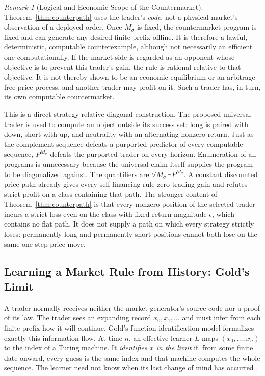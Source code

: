 \documentclass[aps,pra,reprint,superscriptaddress,amsmath,amssymb,floatfix]{revtex4-2}
\theoremstyle{plain}
\theoremstyle{definition}
\theoremstyle{remark}
\newtheorem{remark}{Remark}
\begin{document}
\begin{remark}[Logical and Economic Scope of the Countermarket]
\label{rem:counterpath-scope}
Theorem~\ref{thm:counterpath} uses the trader's \emph{code}, not a physical
market's observation of a deployed order. Once \(M_\sigma\) is fixed, the
countermarket program is fixed and can generate any desired finite prefix
offline. It is therefore a lawful, deterministic, computable counterexample,
although not necessarily an efficient one computationally. If the market side
is regarded as an opponent whose objective is to prevent this trader's gain,
the rule is rational relative to that objective. It is not thereby shown to be
an economic equilibrium or an arbitrage-free price process, and another trader
may profit on it. Such a trader has, in turn, its own computable countermarket.
\end{remark}

This is a direct strategy-relative diagonal construction. The proposed
universal trader is used to compute an object outside its success set: long is
paired with down, short with up, and neutrality with an alternating nonzero
return. Just as
the complement sequence defeats a purported predictor of every computable
sequence, \(P^{M_\sigma}\) defeats the purported trader on every horizon.
Enumeration of all programs is unnecessary because the universal claim itself
supplies the program to be diagonalized against. The quantifiers are
\(\forall M_\sigma\,\exists P^{M_\sigma}\). A constant discounted price path
already gives every self-financing rule zero trading gain and refutes strict
profit on a class containing that path. The stronger content of
Theorem~\ref{thm:counterpath} is that every nonzero position of the selected
trader incurs a strict loss even on the class with fixed return magnitude
\(\epsilon\), which contains no flat path. It does not supply a path on which every strategy
strictly loses: permanently long and permanently short positions cannot both
lose on the same one-step price move.

\subsection{Learning a Market Rule from History: Gold's Limit}

A trader normally receives neither the market generator's source code nor a
proof of its law. The trader sees an expanding record
\(x_0,x_1,\ldots\) and must infer from each finite prefix how it will continue.
Gold's function-identification model formalizes exactly this information flow.
At time \(n\), an effective learner \(L\) maps
\((x_0,\ldots,x_n)\) to the index of a Turing machine. It
\emph{identifies \(x\) in the limit} if, from some finite date onward, every
guess is the same index and that machine computes the whole sequence. The
learner need not know when its last change of mind has occurred
\cite{go-65,go-67}.
\end{document}
